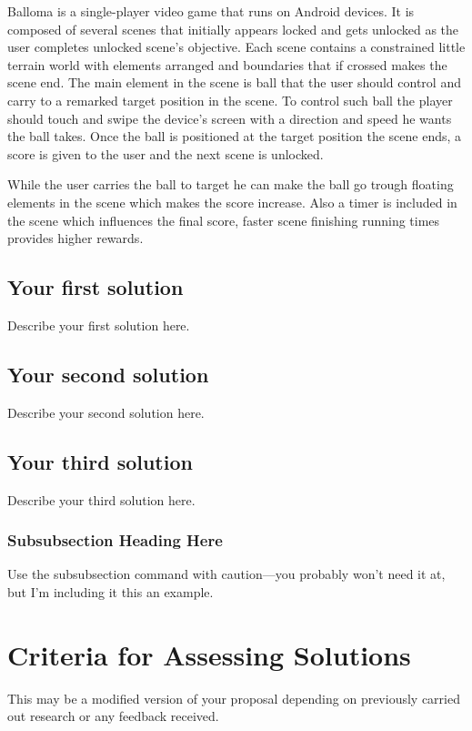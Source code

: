 \documentclass[peerreview]{IEEEtran}
\begin{document}
   Balloma is a single-player video game that runs on Android devices. It is composed of several scenes that initially appears locked and gets unlocked as the user completes unlocked scene's objective. Each scene contains a constrained little terrain world with elements arranged and boundaries that if crossed makes the scene end. The main element in the scene is ball that the user should control and carry to a remarked target position in the scene. To control such ball the player should touch and swipe the device's screen with a direction and speed he wants the ball takes.  Once the ball is positioned at the target position the scene ends, a score is given to the user and the next scene is unlocked. 
   
   While the user carries the ball to target he can make the ball go trough floating elements in the scene which makes the score increase. Also a timer is included in the scene which influences the final score, faster scene finishing running times provides higher rewards. 
 
   
\subsection{Your first solution}
Describe your first solution here.
\subsection{Your second solution}
Describe your second solution here.
\subsection{Your third solution}
Describe your third solution here.
\subsubsection{Subsubsection Heading Here}
Use the subsubsection command with caution---you probably won't need it at, but I'm including it this an example.

\section{Criteria for Assessing Solutions} \label{sec:criteria}
This may be a modified version of your proposal depending on previously carried out research or any feedback received.  
\end{document}
